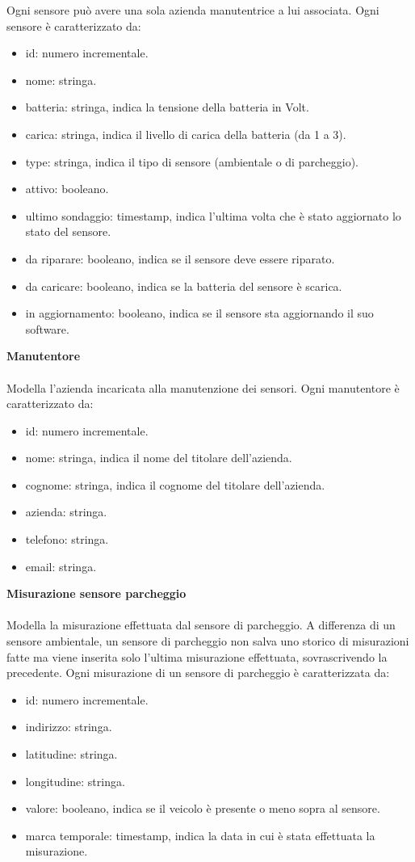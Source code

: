 Ogni sensore può avere una sola azienda manutentrice a lui associata.
Ogni sensore è caratterizzato da:
\begin{itemize}
    \item id: numero incrementale.
    \item nome: stringa.
    \item batteria: stringa, indica la tensione della batteria in Volt.
    \item carica: stringa, indica il livello di carica della batteria (da 1 a 3).
    \item type: stringa, indica il tipo di sensore (ambientale o di parcheggio).
    \item attivo: booleano.
    \item ultimo sondaggio: timestamp, indica l'ultima volta che è stato aggiornato lo stato del sensore.
    \item da riparare: booleano, indica se il sensore deve essere riparato.
    \item da caricare: booleano, indica se la batteria del sensore è scarica.
    \item in aggiornamento: booleano, indica se il sensore sta aggiornando il suo software.
\end{itemize}
\leavevmode\newline
\textbf{Manutentore}
\\\\
Modella l'azienda incaricata alla manutenzione dei sensori.
Ogni manutentore è caratterizzato da:
\begin{itemize}
    \item id: numero incrementale.
    \item nome: stringa, indica il nome del titolare dell'azienda.
    \item cognome: stringa, indica il cognome del titolare dell'azienda.
    \item azienda: stringa.
    \item telefono: stringa.
    \item email: stringa.
\end{itemize}
\leavevmode\newline
\textbf{Misurazione sensore parcheggio}
\\\\
Modella la misurazione effettuata dal sensore di parcheggio. A differenza di un sensore ambientale, un sensore
di parcheggio non salva uno storico di misurazioni fatte ma viene inserita solo l'ultima misurazione effettuata,
sovrascrivendo la precedente.
Ogni misurazione di un sensore di parcheggio è caratterizzata da:
\begin{itemize}
    \item id: numero incrementale.
    \item indirizzo: stringa.
    \item latitudine: stringa.
    \item longitudine: stringa.
    \item valore: booleano, indica se il veicolo è presente o meno sopra al sensore.
    \item marca temporale: timestamp, indica la data in cui è stata effettuata la misurazione.
\end{itemize}

